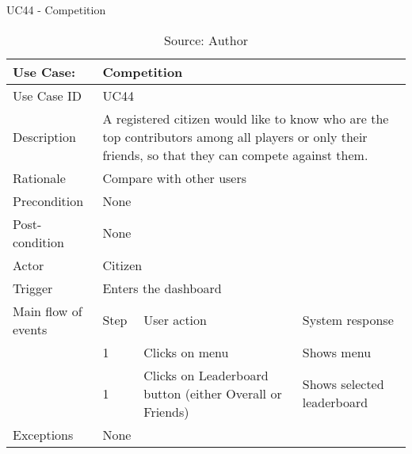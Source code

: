 \begin{table}[ht]
\centering
\caption{UC44 - Competition}
\label{uc:44}
\begin{tabular}{|p{3cm}|p{1cm}|p{5cm}|p{5cm}|}
\hline
Use Case:       & \multicolumn{3}{p{11cm}|}{Competition} \\ \hline
Use Case ID     & \multicolumn{3}{p{11cm}|}{UC44} \\ \hline
Description     & \multicolumn{3}{p{11cm}|}{A registered citizen would like to know who are the top contributors among all players or only their friends, so that they can compete against them.} \\ \hline
Rationale       & \multicolumn{3}{p{11cm}|}{Compare with other users} \\ \hline
Precondition    & \multicolumn{3}{p{11cm}|}{None} \\ \hline
Post-condition  & \multicolumn{3}{p{11cm}|}{None} \\ \hline
Actor           & \multicolumn{3}{p{11cm}|}{Citizen} \\ \hline
Trigger         & \multicolumn{3}{p{11cm}|}{Enters the dashboard} \\ \hline
Main flow of events & Step  & User action & System response \\ \hline
                    & 1     & Clicks on menu & Shows menu \\ \hline
                    & 1     & Clicks on Leaderboard button (either Overall or Friends) & Shows selected leaderboard \\ \hline
Exceptions      & \multicolumn{3}{p{11cm}|}{None} \\ \hline
\end{tabular}
\caption*{Source: Author}
\end{table}

